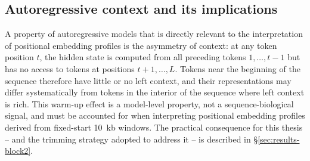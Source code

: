 \subsection{Autoregressive context and its implications}

A property of autoregressive models that is directly relevant to the interpretation of
positional embedding profiles is the asymmetry of context:
at any token position $t$, the hidden state is computed from all preceding tokens
$1, \ldots, t-1$ but has no access to tokens at positions $t+1, \ldots, L$.
Tokens near the beginning of the sequence therefore have little or no left context, and their
representations may differ systematically from tokens in the interior of the sequence where
left context is rich.
This warm-up effect is a model-level property, not a sequence-biological signal, and must be
accounted for when interpreting positional embedding profiles derived from fixed-start 10~kb
windows.
The practical consequence for this thesis -- and the trimming strategy adopted to address it
-- is described in §\ref{sec:results-block2}. %

\shorthandon{-} 
